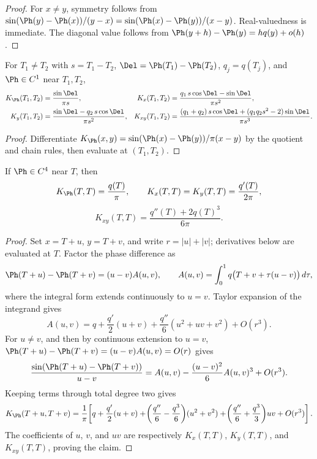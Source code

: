 \begin{proof}
For \(x\ne y\), symmetry follows from
\(\sin(\Ph(y)-\Ph(x))/(y-x) = \sin(\Ph(x)-\Ph(y))/(x-y)\).
Real-valuedness is immediate.  The diagonal value follows from
\(\Ph(y+h)-\Ph(y) = h q(y) + o(h)\).
\end{proof}

\begin{lemma}
\label{lem:phase-kernel-derivatives}
For \(T_1\ne T_2\) with \(s=T_1-T_2\), \(\Del=\Ph(T_1)-\Ph(T_2)\),
\(q_j=q(T_j)\), and \(\Ph\in C^1\) near \(T_1, T_2\),
\begin{align*}
K_\Ph(T_1,T_2) &= \frac{\sin\Del}{\pi s},
&K_x(T_1,T_2) &= \frac{q_1\,s\cos\Del - \sin\Del}{\pi s^2},\\
K_y(T_1,T_2) &= \frac{\sin\Del - q_2\,s\cos\Del}{\pi s^2},
&K_{xy}(T_1,T_2)
&= \frac{(q_1+q_2)\,s\cos\Del + (q_1 q_2 s^2 - 2)\sin\Del}{\pi s^3}.
\end{align*}
\end{lemma}

\begin{proof}
Differentiate \(K_\Ph(x,y) = \sin(\Ph(x)-\Ph(y))/\pi(x-y)\) by the
quotient and chain rules, then evaluate at \((T_1, T_2)\).
\end{proof}

\begin{lemma}
\label{lem:phase-kernel-diagonal-derivatives}
If \(\Ph\in C^4\) near \(T\), then
\begin{equation}
\label{eq:diagonal-kernel-derivatives}
K_\Ph(T,T)=\frac{q(T)}{\pi},\qquad
K_x(T,T)=K_y(T,T)=\frac{q'(T)}{2\pi},
\end{equation}
\[
        K_{xy}(T,T)=\frac{q''(T)+2q(T)^3}{6\pi}.
\]
\end{lemma}

\begin{proof}
Set \(x=T+u\), \(y=T+v\), and write \(r=|u|+|v|\); derivatives below
are evaluated at \(T\).  Factor the phase difference as
\[
\Ph(T+u)-\Ph(T+v)=(u-v)A(u,v),\qquad
A(u,v)=\int_0^1 q\bigl(T+v+\tau(u-v)\bigr)\,d\tau,
\]
where the integral form extends continuously to \(u=v\).  Taylor
expansion of the integrand gives
\[
A(u,v)
= q+\frac{q'}2(u+v)+\frac{q''}{6}(u^2+uv+v^2)+O(r^3).
\]
For \(u\ne v\), and then by continuous extension to \(u=v\),
\(\Ph(T+u)-\Ph(T+v)=(u-v)A(u,v)=O(r)\) gives
\[
\frac{\sin(\Ph(T+u)-\Ph(T+v))}{u-v}
= A(u,v)-\frac{(u-v)^2}{6}A(u,v)^3+O(r^3).
\]
Keeping terms through total degree two gives
\[
K_\Ph(T+u,T+v)
= \frac1\pi\!\left[
 q + \frac{q'}{2}(u+v)
 + \!\left(\frac{q''}{6} - \frac{q^3}{6}\right)\!(u^2+v^2)
 + \!\left(\frac{q''}{6} + \frac{q^3}{3}\right)\!uv
 + O(r^3)\right].
\]
The coefficients of \(u\), \(v\), and \(uv\) are respectively
\(K_x(T,T)\), \(K_y(T,T)\), and \(K_{xy}(T,T)\), proving the claim.
\end{proof}

